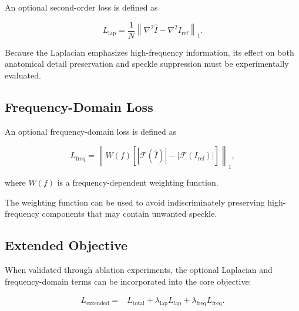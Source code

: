 \documentclass[conference]{IEEEtran}
\begin{document}
An optional second-order loss is defined as

\begin{equation}
L_{\mathrm{lap}}
=
\frac{1}{N}
\left\|
\nabla^2\hat I
-
\nabla^2I_{\mathrm{ref}}
\right\|_1.
\label{eq:lap_loss}
\end{equation}

Because the Laplacian emphasizes high-frequency information, its
effect on both anatomical detail preservation and speckle suppression
must be experimentally evaluated.


\subsection{Frequency-Domain Loss}

An optional frequency-domain loss is defined as

\begin{equation}
L_{\mathrm{freq}}
=
\left\|
W(f)
\left[
|\mathcal{F}(\hat I)|
-
|\mathcal{F}(I_{\mathrm{ref}})|
\right]
\right\|_1,
\label{eq:frequency_loss}
\end{equation}

where $W(f)$ is a frequency-dependent weighting function.

The weighting function can be used to avoid indiscriminately
preserving high-frequency components that may contain unwanted
speckle.



\subsection{Extended Objective}

When validated through ablation experiments, the optional Laplacian
and frequency-domain terms can be incorporated into the core objective:

\begin{equation}
\boxed{
\begin{aligned}
L_{\mathrm{extended}}
={}&
L_{\mathrm{total}}
+
\lambda_{\mathrm{lap}}L_{\mathrm{lap}}
+
\lambda_{\mathrm{freq}}L_{\mathrm{freq}}.
\end{aligned}
}
\label{eq:extended_loss}
\end{equation}
\end{document}
